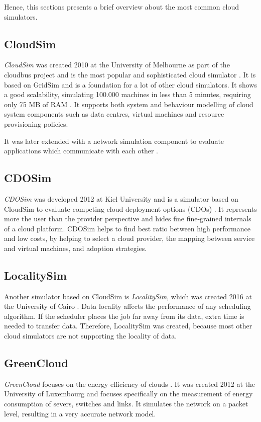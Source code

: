 Hence, this sections presents a brief overview about the most common cloud simulators.

\subsection{CloudSim}
\textit{CloudSim} was created 2010 at the University of Melbourne as part of the cloudbus project and is the most popular and sophisticated cloud simulator \cite{compare_grid_cloud}. It is based on GridSim and is a foundation for a lot of other cloud simulators.
It shows a good scalability, simulating 100.000 machines in less than 5 minutes, requiring only 75 MB of RAM \cite{survey_clouds}. It supports both system and behaviour modelling of cloud system components such as data centres, virtual machines and resource provisioning policies.

It was later extended with a network simulation component to evaluate applications which communicate with each other \cite{networkcloudsim}.

\subsection{CDOSim}
\textit{CDOSim} was developed 2012 at Kiel University and is a simulator based on CloudSim to evaluate competing cloud deployment options (CDOs) \cite{cdosim}. It represents more the user than the provider perspective and hides fine fine-grained internals of a cloud platform. CDOSim helps to find best ratio between high performance and low costs, by helping to select a cloud provider, the mapping between service and virtual machines, and adoption strategies. 

\subsection{LocalitySim}
Another simulator based on CloudSim is \textit{LocalitySim}, which was created 2016 at the University of Cairo \cite{localitysim}. Data locality affects the performance of any scheduling algorithm. If the scheduler places the job far away from its data, extra time is needed to transfer data. Therefore, LocalitySim was created, because most other cloud simulators are not supporting the locality of data.

\subsection{GreenCloud}
\textit{GreenCloud} focuses on the energy efficiency of clouds \cite{green_cloud}. It was created 2012 
at the University of Luxembourg and focuses specifically on the measurement of energy consumption of severs, switches and links. It simulates the network on a packet level, resulting in a very accurate network model.  


